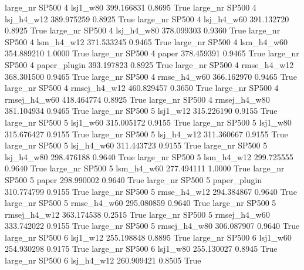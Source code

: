   large_nr    SP500                 4     lsj1_w80  399.166831      0.8695    True
  large_nr    SP500                 4   lsj_h4_w12  389.975259      0.8925    True
  large_nr    SP500                 4   lsj_h4_w60  391.132720      0.8925    True
  large_nr    SP500                 4   lsj_h4_w80  378.099303      0.9360    True
  large_nr    SP500                 4   lsm_h4_w12  371.533245      0.9465    True
  large_nr    SP500                 4   lsm_h4_w60  354.889210      1.0000    True
  large_nr    SP500                 4        paper  378.459391      0.9465    True
  large_nr    SP500                 4 paper_plugin  393.197823      0.8925    True
  large_nr    SP500                 4  rmse_h4_w12  368.301500      0.9465    True
  large_nr    SP500                 4  rmse_h4_w60  366.162970      0.9465    True
  large_nr    SP500                 4 rmsej_h4_w12  460.829457      0.3650    True
  large_nr    SP500                 4 rmsej_h4_w60  418.464774      0.8925    True
  large_nr    SP500                 4 rmsej_h4_w80  381.104934      0.9465    True
  large_nr    SP500                 5     lsj1_w12  315.226190      0.9155    True
  large_nr    SP500                 5     lsj1_w60  315.005172      0.9155    True
  large_nr    SP500                 5     lsj1_w80  315.676427      0.9155    True
  large_nr    SP500                 5   lsj_h4_w12  311.360667      0.9155    True
  large_nr    SP500                 5   lsj_h4_w60  311.443723      0.9155    True
  large_nr    SP500                 5   lsj_h4_w80  298.476188      0.9640    True
  large_nr    SP500                 5   lsm_h4_w12  299.725555      0.9640    True
  large_nr    SP500                 5   lsm_h4_w60  277.494111      1.0000    True
  large_nr    SP500                 5        paper  298.990002      0.9640    True
  large_nr    SP500                 5 paper_plugin  310.774799      0.9155    True
  large_nr    SP500                 5  rmse_h4_w12  294.384867      0.9640    True
  large_nr    SP500                 5  rmse_h4_w60  295.080859      0.9640    True
  large_nr    SP500                 5 rmsej_h4_w12  363.174538      0.2515    True
  large_nr    SP500                 5 rmsej_h4_w60  333.742022      0.9155    True
  large_nr    SP500                 5 rmsej_h4_w80  306.087907      0.9640    True
  large_nr    SP500                 6     lsj1_w12  255.198848      0.8895    True
  large_nr    SP500                 6     lsj1_w60  254.930298      0.9175    True
  large_nr    SP500                 6     lsj1_w80  255.130027      0.8945    True
  large_nr    SP500                 6   lsj_h4_w12  260.909421      0.8505    True
